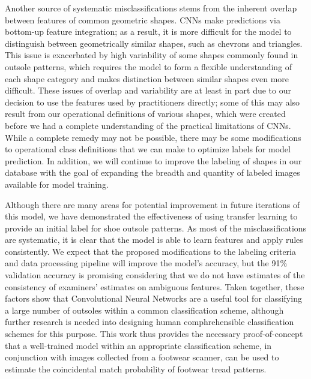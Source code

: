 \documentclass{article}\usepackage[]{graphicx}\usepackage[table]{xcolor}
\begin{document}
Another source of systematic misclassifications stems from the inherent overlap between features of common geometric shapes. CNNs make predictions via bottom-up feature integration; as a result, it is more difficult for the model to distinguish between geometrically similar shapes, such as chevrons and triangles. This issue is exacerbated by high variability of some shapes commonly found in outsole patterns, which requires the model to form a flexible understanding of each shape category and makes distinction between similar shapes even more difficult. These issues of overlap and variability are at least in part due to our decision to use the features used by practitioners directly; some of this may also result from our operational definitions of various shapes, which were created before we had a complete understanding of the practical limitations of CNNs. While a complete remedy may not be possible, there may be some modifications to operational class definitions that we can make to optimize labels for model prediction. In addition, we will continue to improve the labeling of shapes in our database with the goal of expanding the breadth and quantity of labeled images available for model training.

Although there are many areas for potential improvement in future iterations of this model, we have demonstrated the effectiveness of using transfer learning to provide an initial label for shoe outsole patterns. As most of the misclassifications are systematic, it is clear that the model is able to learn features and apply rules consistently. We expect that the proposed modifications to the labeling criteria and data processing pipeline will improve the model's accuracy, but the 91\% validation accuracy is promising considering that we do not have estimates of the consistency of examiners' estimates on ambiguous features. Taken together, these factors show that Convolutional Neural Networks are a useful tool for classifying a large number of outsoles within a common classification scheme, although further research is needed into designing human comphrehensible classification schemes for this purpose. This work thus provides the necessary proof-of-concept that a well-trained model within an appropriate classification scheme, in conjunction with images collected from a footwear scanner, can be used to estimate the coincidental match probability of footwear tread patterns.






\end{document}
